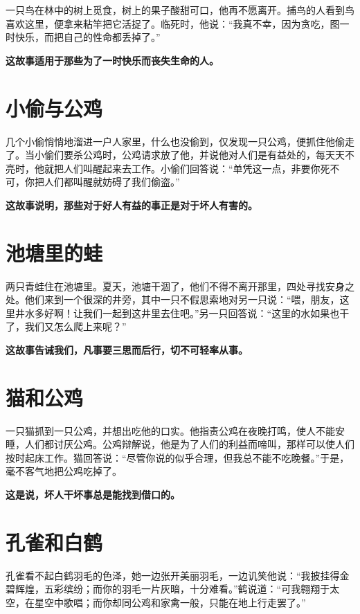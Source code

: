 一只鸟在林中的树上觅食，树上的果子酸甜可口，他再不愿离开。捕鸟的人看到鸟喜欢这里，便拿来粘竿把它活捉了。临死时，他说：“我真不幸，因为贪吃，图一时快乐，而把自己的性命都丢掉了。”

{\bfseries \color{red}这故事适用于那些为了一时快乐而丧失生命的人。}

\section{小偷与公鸡}

几个小偷悄悄地溜进一户人家里，什么也没偷到，仅发现一只公鸡，便抓住他偷走了。当小偷们要杀公鸡时，公鸡请求放了他，并说他对人们是有益处的，每天天不亮时，他就把人们叫醒起来去工作。小偷们回答说：“单凭这一点，非要你死不可，你把人们都叫醒就妨碍了我们偷盗。”

{\bfseries \color{red}这故事说明，那些对于好人有益的事正是对于坏人有害的。}

\section{池塘里的蛙}

两只青蛙住在池塘里。夏天，池塘干涸了，他们不得不离开那里，四处寻找安身之处。他们来到一个很深的井旁，其中一只不假思索地对另一只说：“喂，朋友，这里井水多好啊！让我们一起到这井里去住吧。”另一只回答说：“这里的水如果也干了，我们又怎么爬上来呢？”

{\bfseries \color{red}这故事告诫我们，凡事要三思而后行，切不可轻率从事。}

\section{猫和公鸡}

一只猫抓到一只公鸡，并想出吃他的口实。他指责公鸡在夜晚打鸣，使人不能安睡，人们都讨厌公鸡。公鸡辩解说，他是为了人们的利益而啼叫，那样可以使人们按时起床工作。猫回答说：“尽管你说的似乎合理，但我总不能不吃晚餐。”于是，毫不客气地把公鸡吃掉了。

{\bfseries \color{red}这是说，坏人干坏事总是能找到借口的。}

\section{孔雀和白鹤}

孔雀看不起白鹤羽毛的色泽，她一边张开美丽羽毛，一边讥笑他说：“我披挂得金碧辉煌，五彩缤纷；而你的羽毛一片灰暗，十分难看。”鹤说道：“可我翱翔于太空，在星空中歌唱；而你却同公鸡和家禽一般，只能在地上行走罢了。”

